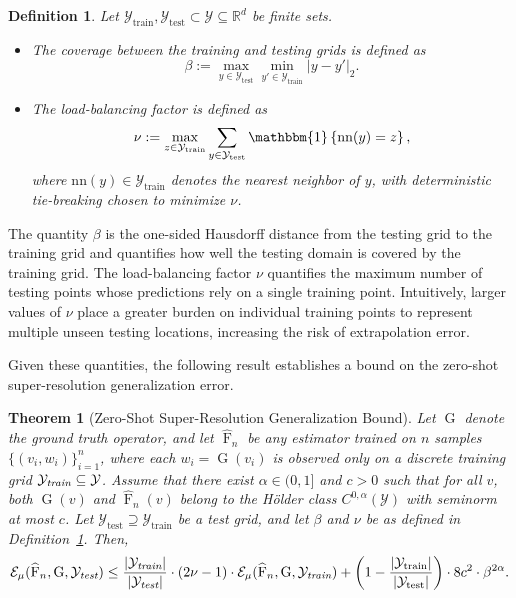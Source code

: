 \documentclass[11pt]{article}
\theoremstyle{plain}
\newtheorem{theorem}{Theorem}
\newtheorem{definition}{Definition}
\newcommand{\Ycal}{\mathcal{Y}}
\begin{document}
\begin{definition}\label{def:grid_params}
Let $ \Ycal_{\mathrm{train}}, \Ycal_{\mathrm{test}} \subset \Ycal \subseteq \mathbb{R}^d $ be finite sets.

\begin{itemize}
  \item[\emph{(i)}] The \emph{coverage} between the training and testing grids is defined as
  \[
  \beta := \max_{y \in \Ycal_{\mathrm{test}}} \min_{y' \in \Ycal_{\mathrm{train}}} |y - y'|_2.
  \]



  \item[\emph{(ii)}] The \emph{load-balancing factor} is defined as
  \[
  \nu := \max_{z \in \Ycal_{\mathrm{train}}} \sum_{y \in \Ycal_{\mathrm{test}}} \mathbbm{1} \left\{ \mathrm{nn}(y) = z \right\},
  \]
  where $ \mathrm{nn}(y) \in \Ycal_{\mathrm{train}} $ denotes the nearest neighbor of $ y $, with deterministic tie-breaking chosen to minimize $ \nu $.
\end{itemize}
\end{definition}

The quantity $\beta$ is the one-sided Hausdorff distance from the testing grid to the training grid and quantifies how well the testing domain is covered by the training grid. The load-balancing factor $\nu$  quantifies the maximum number of testing points whose predictions rely on a single training
point. Intuitively, larger values of $\nu$ place a greater burden on individual training points to represent multiple unseen testing locations, increasing the risk of extrapolation error.


Given these quantities, the following result establishes a bound on the zero-shot super-resolution generalization error.

\begin{theorem}[Zero-Shot Super-Resolution Generalization Bound]
\label{thm:ub}
Let $ \operatorname{G} $ denote the ground truth operator, and let $ \widehat{\operatorname{F}}_n $ be any estimator trained on $ n $ samples $ \{(v_i, w_i)\}_{i=1}^n $, where each $ w_i = \operatorname{G}(v_i) $ is observed only on a discrete training grid $ \Ycal_{\emph{train}} \subseteq \Ycal $.  Assume that there exist $ \alpha \in (0,1] $ and $ c > 0 $ such that for all $ v $, both $ \operatorname{G}(v) $ and $ \widehat{\operatorname{F}}_n(v) $ belong to the Hölder class $ C^{0,\alpha}(\Ycal) $ with seminorm at most $ c $. Let $ \Ycal_{\mathrm{test}} \supseteq \Ycal_{\mathrm{train}} $ be a test grid, and let $\beta$ and $\nu$ be as defined in Definition~\ref{def:grid_params}. Then,
\begin{equation*}
\begin{split}
\mathcal{E}_{\mu}(\widehat{\operatorname{F}}_n, \operatorname{G}, \Ycal_{\emph{test}}) 
\leq 
\frac{|\Ycal_{\emph{train}}|}{|\Ycal_{\emph{test}}|} \cdot (2\nu-1)\cdot 
\mathcal{E}_{\mu}(\widehat{\operatorname{F}}_n, \operatorname{G}, \Ycal_{\emph{train}}) + \left(1-\frac{|\Ycal_{\mathrm{train}}|}{|\Ycal_{\mathrm{test}}|}\right) \cdot 8c^2 \cdot \beta^{2\alpha}.
\end{split}
\end{equation*}
\end{theorem}
\end{document}

